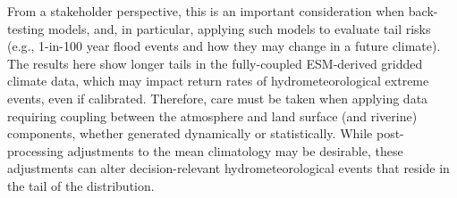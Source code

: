 \documentclass[draft]{agujournal2019}
\begin{document}
From a stakeholder perspective, this is an important consideration when back-testing models, and, in particular, applying such models to evaluate tail risks (e.g., 1-in-100 year flood events and how they may change in a future climate). 
The results here show longer tails in the fully-coupled ESM-derived gridded climate data, which may impact return rates of hydrometeorological extreme events, even if calibrated. 
Therefore, care must be taken when applying data requiring coupling between the atmosphere and land surface (and riverine) components, whether generated dynamically or statistically. 
While post-processing adjustments to the mean climatology may be desirable, these adjustments can alter decision-relevant hydrometeorological events that reside in the tail of the distribution.







%
%
%
%
%
%
%
%
%
%
\end{document}
